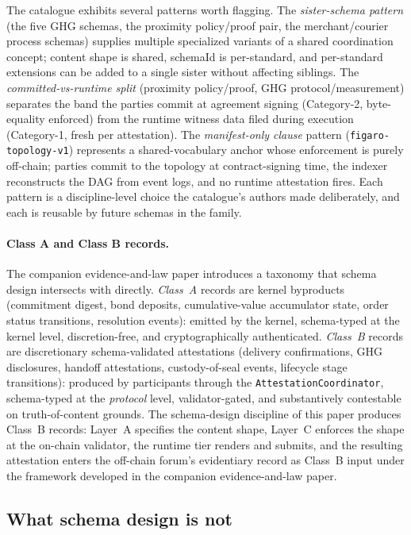 \documentclass[11pt,a4paper]{article}
\theoremstyle{definition}
\theoremstyle{remark}
\begin{document}
The catalogue exhibits several patterns worth flagging. The
\emph{sister-schema pattern} (the five GHG schemas, the proximity
policy/proof pair, the merchant/courier process schemas) supplies
multiple specialized variants of a shared coordination concept;
content shape is shared, schemaId is per-standard, and per-standard
extensions can be added to a single sister without affecting
siblings. The \emph{committed-vs-runtime split} (proximity
policy/proof, GHG protocol/measurement) separates the band the
parties commit at agreement signing (Category-2, byte-equality
enforced) from the runtime witness data filed during execution
(Category-1, fresh per attestation). The \emph{manifest-only
clause} pattern (\texttt{figaro-topology-v1}) represents a
shared-vocabulary anchor whose enforcement is purely off-chain;
parties commit to the topology at contract-signing time, the
indexer reconstructs the DAG from event logs, and no runtime
attestation fires. Each pattern is a discipline-level choice the
catalogue's authors made deliberately, and each is reusable by
future schemas in the family.

\paragraph{Class A and Class B records.}
The companion evidence-and-law paper introduces a taxonomy that
schema design intersects with directly. \emph{Class~A} records
are kernel byproducts (commitment digest, bond deposits,
cumulative-value accumulator state, order status transitions,
resolution events): emitted by the kernel, schema-typed at the
kernel level, discretion-free, and cryptographically
authenticated. \emph{Class~B} records are discretionary
schema-validated attestations (delivery confirmations, GHG
disclosures, handoff attestations, custody-of-seal events,
lifecycle stage transitions): produced by participants through
the \texttt{AttestationCoordinator}, schema-typed at the
\emph{protocol} level, validator-gated, and substantively
contestable on truth-of-content grounds. The schema-design
discipline of this paper produces Class~B records: Layer~A
specifies the content shape, Layer~C enforces the shape at the
on-chain validator, the runtime tier renders and submits, and
the resulting attestation enters the off-chain forum's
evidentiary record as Class~B input under the framework
developed in the companion evidence-and-law paper.

\subsection{What schema design is not}
\end{document}
